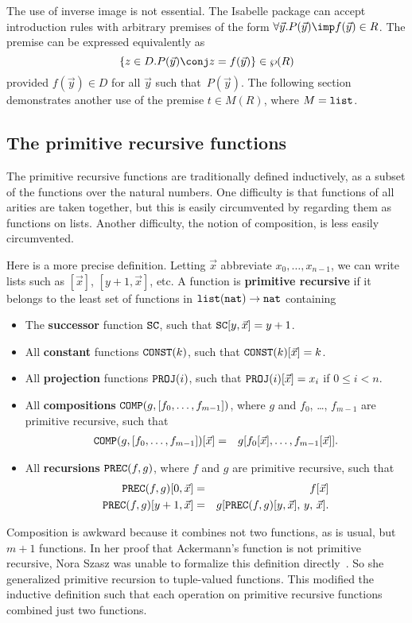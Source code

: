 The use of inverse image is not essential.  The Isabelle package can accept
introduction rules with arbitrary premises of the form $\forall
\vec{y}.P(\vec{y})\imp f(\vec{y})\in R$.  The premise can be expressed
equivalently as 
\[ \{z\in D. P(\vec{y}) \conj z=f(\vec{y})\} \in \pow(R) \] 
provided $f(\vec{y})\in D$ for all $\vec{y}$ such that~$P(\vec{y})$.  The
following section demonstrates another use of the premise $t\in M(R)$,
where $M={\tt list}$. 

\subsection{The primitive recursive functions}\label{primrec-sec}
The primitive recursive functions are traditionally defined inductively, as
a subset of the functions over the natural numbers.  One difficulty is that
functions of all arities are taken together, but this is easily
circumvented by regarding them as functions on lists.  Another difficulty,
the notion of composition, is less easily circumvented.

Here is a more precise definition.  Letting $\vec{x}$ abbreviate
$x_0,\ldots,x_{n-1}$, we can write lists such as $[\vec{x}]$,
$[y+1,\vec{x}]$, etc.  A function is {\bf primitive recursive} if it
belongs to the least set of functions in ${\tt list}({\tt nat})\to{\tt nat}$ containing
\begin{itemize}
\item The {\bf successor} function ${\tt SC}$, such that ${\tt SC}[y,\vec{x}]=y+1$.
\item All {\bf constant} functions ${\tt CONST}(k)$, such that
  ${\tt CONST}(k)[\vec{x}]=k$. 
\item All {\bf projection} functions ${\tt PROJ}(i)$, such that
  ${\tt PROJ}(i)[\vec{x}]=x_i$ if $0\leq i<n$. 
\item All {\bf compositions} ${\tt COMP}(g,[f_0,\ldots,f_{m-1}])$, 
where $g$ and $f_0$, \ldots, $f_{m-1}$ are primitive recursive,
such that
\begin{eqnarray*}
  {\tt COMP}(g,[f_0,\ldots,f_{m-1}])[\vec{x}] & = & 
  g[f_0[\vec{x}],\ldots,f_{m-1}[\vec{x}]].
\end{eqnarray*} 

\item All {\bf recursions} ${\tt PREC}(f,g)$, where $f$ and $g$ are primitive
  recursive, such that
\begin{eqnarray*}
  {\tt PREC}(f,g)[0,\vec{x}] & = & f[\vec{x}] \\
  {\tt PREC}(f,g)[y+1,\vec{x}] & = & g[{\tt PREC}(f,g)[y,\vec{x}],\, y,\, \vec{x}].
\end{eqnarray*} 
\end{itemize}
Composition is awkward because it combines not two functions, as is usual,
but $m+1$ functions.  In her proof that Ackermann's function is not
primitive recursive, Nora Szasz was unable to formalize this definition
directly~\cite{szasz93}.  So she generalized primitive recursion to
tuple-valued functions.  This modified the inductive definition such that
each operation on primitive recursive functions combined just two functions.

